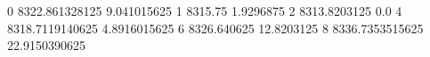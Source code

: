 0 8322.861328125 9.041015625
1 8315.75 1.9296875
2 8313.8203125 0.0
4 8318.7119140625 4.8916015625
6 8326.640625 12.8203125
8 8336.7353515625 22.9150390625
